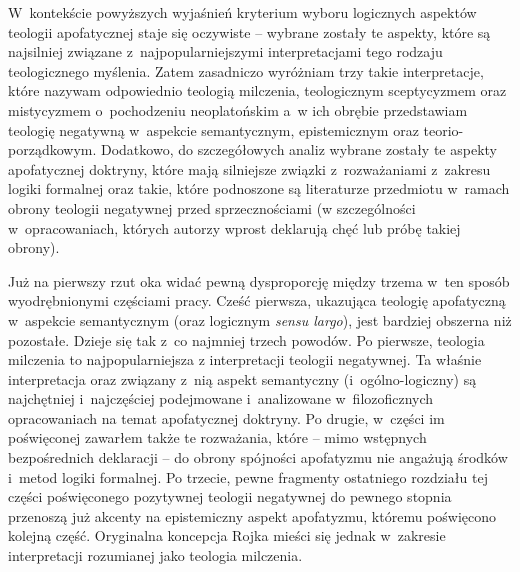 W~kontekście powyższych wyjaśnień kryterium wyboru logicznych aspektów teologii apofatycznej staje się oczywiste -- wybrane zostały te aspekty, które są najsilniej związane z~najpopularniejszymi interpretacjami tego rodzaju teologicznego myślenia. Zatem zasadniczo wyróżniam trzy takie interpretacje, które nazywam odpowiednio teologią milczenia, teologicznym sceptycyzmem oraz mistycyzmem o~pochodzeniu neoplatońskim a~w ich obrębie przedstawiam teologię negatywną w~aspekcie semantycznym, epistemicznym oraz teorio-porządkowym. Dodatkowo, do szczegółowych analiz wybrane zostały te aspekty apofatycznej doktryny, które mają silniejsze związki z~rozważaniami z~zakresu logiki formalnej oraz takie, które podnoszone są literaturze przedmiotu w~ramach obrony teologii negatywnej przed sprzecznościami (w szczególności w~opracowaniach, których autorzy wprost deklarują chęć lub próbę takiej obrony).

Już na pierwszy rzut oka widać pewną dysproporcję między trzema w~ten sposób wyodrębnionymi częściami pracy. Cześć pierwsza, ukazująca teologię apofatyczną w~aspekcie semantycznym (oraz logicznym \textit{sensu largo}), jest bardziej obszerna niż pozostałe. Dzieje się tak z~co najmniej trzech powodów. Po pierwsze,
teologia milczenia to najpopularniejsza z interpretacji teologii negatywnej.
Ta właśnie interpretacja oraz związany z~nią aspekt semantyczny (i~ogólno-logiczny) są najchętniej i~najczęściej podejmowane i~analizowane w~filozoficznych opracowaniach na temat apofatycznej doktryny. Po drugie, w~części im poświęconej zawarłem także te rozważania, które -- mimo wstępnych bezpośrednich deklaracji -- do obrony spójności apofatyzmu nie angażują środków i~metod logiki formalnej. Po trzecie, pewne fragmenty ostatniego rozdziału tej części poświęconego pozytywnej teologii negatywnej do pewnego stopnia przenoszą już akcenty na epistemiczny aspekt apofatyzmu, któremu poświęcono kolejną część. Oryginalna koncepcja Rojka mieści się jednak w~zakresie interpretacji rozumianej jako teologia milczenia.

